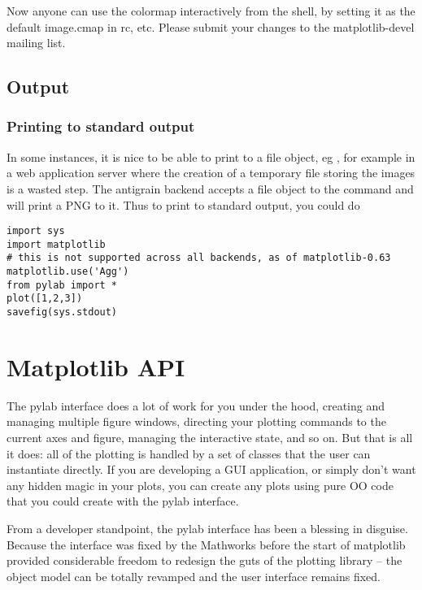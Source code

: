 \documentclass[twoside]{book}
\begin{document}
\noindent Now anyone can use the colormap interactively from the shell, by
setting it as the default image.cmap in rc, etc.  Please submit your
changes to the matplotlib-devel mailing list.

\section{Output}
\label{sec:output}

\subsection{Printing to standard output}
\label{cbook:print_stdout}

In some instances, it is nice to be able to print to a file object, eg
, for example in a web application server where the
creation of a temporary file storing the images is a wasted step.  The
antigrain backend accepts a file object to the  command
and will print a PNG to it.  Thus to print to standard output, you
could do

\begin{lstlisting}
import sys
import matplotlib
# this is not supported across all backends, as of matplotlib-0.63
matplotlib.use('Agg')
from pylab import *
plot([1,2,3])
savefig(sys.stdout)
\end{lstlisting}

\chapter{Matplotlib API}
\label{cha:api}


The pylab interface does a lot of work for you under the hood,
creating and managing multiple figure windows, directing your plotting
commands to the current axes and figure, managing the interactive
state, and so on.  But that is all it does: all of the plotting is
handled by a set of classes that the user can instantiate directly.
If you are developing a GUI application, or simply don't want any
hidden magic in your plots, you can create any plots using pure OO
code that you could create with the pylab interface.

From a developer standpoint, the pylab interface has been a blessing
in disguise.  Because the interface was fixed by the Mathworks before
the start of matplotlib provided considerable freedom to redesign the
guts of the plotting library -- the object model can be totally
revamped and the user interface remains fixed.
\end{document}
